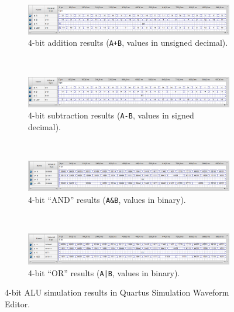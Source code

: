 \documentclass[11pt, letterpaper]{article} %
\begin{document}
\begin{landscape}
\begin{figure}[p]\centering
    \def\figureSpacing{0.5cm}
    \begin{subfigure}{\linewidth}\centering
        \includegraphics[width=0.9\linewidth]{images/sim-adder.png}
        \caption{4-bit addition results (\texttt{A+B}, values in unsigned decimal).}
        \label{fig:wave-sims-adder}
    \end{subfigure}
    \\[\figureSpacing]
    \begin{subfigure}{\linewidth}\centering
        \includegraphics[width=0.9\linewidth]{images/sim-subtractor.png}
        \caption{4-bit subtraction results (\texttt{A-B}, values in signed decimal).}
        \label{fig:wave-sims-subtractor}
    \end{subfigure}
    \\[\figureSpacing]
    \begin{subfigure}{\linewidth}\centering
        \includegraphics[width=0.9\linewidth]{images/sim-and.png}
        \caption{4-bit ``AND'' results (\texttt{A\&B}, values in binary).}
        \label{fig:wave-sims-and}
    \end{subfigure}
    \\[\figureSpacing]
    \begin{subfigure}{\linewidth}\centering
        \includegraphics[width=0.9\linewidth]{images/sim-or.png}
        \caption{4-bit ``OR'' results (\texttt{A|B}, values in binary).}
        \label{fig:wave-sims-or}
    \end{subfigure}
    \caption{4-bit ALU simulation results in Quartus Simulation Waveform Editor.}\label{fig:wave-sims}
\end{figure}
\end{landscape}
\end{document}
